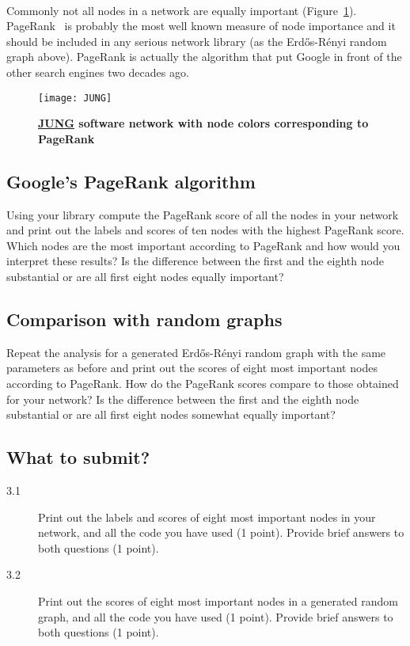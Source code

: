 \documentclass[11pt,a4paper]{article}
\newcommand{\figref}[1]{{\color{LimeGreen}Figure~\ref{fig:#1}}}
\begin{document}
\paragraph{} Commonly not all nodes in a network are equally important (\figref{JUNG}). PageRank~\cite{BP98} is probably the most well known measure of node importance and it should be included in any serious network library (as the Erd\H{o}s-R\'{e}nyi random graph above). PageRank is actually the algorithm that put Google in front of the other search engines two decades ago.

\begin{figure}[t] \centering
	\texttt{[image: JUNG]}
	\caption{{\bf \href{http://jung.sourceforge.net}{JUNG} software network with node colors corresponding to PageRank}}
	\label{fig:JUNG}
\end{figure}

\subsection{Google's PageRank algorithm}

Using your library compute the PageRank score of all the nodes in your network and print out the labels and scores of ten nodes with the highest PageRank score. Which nodes are the most important according to PageRank and how would you interpret these results? Is the difference between the first and the eighth node substantial or are all first eight nodes equally important?

\subsection{Comparison with random graphs}

Repeat the analysis for a generated Erd\H{o}s-R\'{e}nyi random graph with the same parameters as before and print out the scores of eight most important nodes according to PageRank. How do the PageRank scores compare to those obtained for your network? Is the difference between the first and the eighth node substantial or are all first eight nodes somewhat equally important?

\subsection*{What to submit?}

\begin{description}
	\item[3.1] Print out the labels and scores of eight most important nodes in your network, and all the code you have used ({\color{magenta}1 point}). Provide brief answers to both questions ({\color{magenta}1 point}).
	\item[3.2] Print out the scores of eight most important nodes in a generated random graph, and all the code you have used ({\color{magenta}1 point}). Provide brief answers to both questions ({\color{magenta}1 point}).
\end{description}



\end{document}
